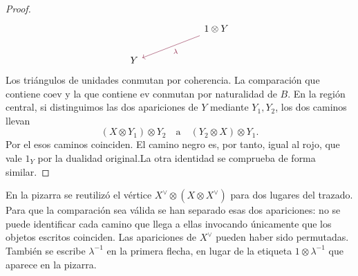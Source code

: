 \begin{proof}
\[\begin{tikzcd}[column sep=6em,row sep=1.8em]
 &1\otimes Y \arrow[dl,"{\lambda}",rojoDiagramaCIMAT]\\
Y&
\end{tikzcd}
\]
Los triángulos de unidades conmutan por coherencia. La comparación que contiene $\mathrm{coev}$ y la que contiene $\mathrm{ev}$ conmutan por naturalidad de $B$. En la región central, si distinguimos las dos apariciones de $Y$ mediante $Y_1,Y_2$, los dos caminos llevan
\[
(X\otimes Y_1)\otimes Y_2
\quad\text{a}\quad
(Y_2\otimes X)\otimes Y_1.
\]
Por el  esos caminos coinciden. El camino negro es, por tanto, igual al rojo, que vale $1_Y$ por la dualidad original.La otra identidad se comprueba de forma similar.
\end{proof}

\begin{nota}
En la pizarra se reutilizó el vértice $X^\vee\otimes(X\otimes X^\vee)$ para dos lugares del trazado. Para que la comparación sea válida se han separado esas dos apariciones: no se puede identificar cada camino que llega a ellas invocando únicamente que los objetos escritos coinciden. Las apariciones de $X^\vee$ pueden haber sido permutadas. También se escribe $\lambda^{-1}$ en la primera flecha, en lugar de la etiqueta $1\otimes\lambda^{-1}$ que aparece en la pizarra.
\end{nota}

